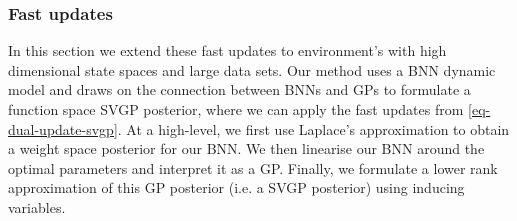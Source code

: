 \documentclass{article}
\begin{document}
\subsubsection{Fast updates}


In this section we extend these fast updates to environment's with high dimensional state spaces and large data sets.
Our method uses a BNN dynamic model and draws on the connection between BNNs and GPs
\citep{khanApproximate2019} to formulate a function space SVGP posterior,
where we can apply the fast updates from \cref{eq-dual-update-svgp}.
At a high-level, we first use Laplace's approximation to obtain a weight space posterior for our BNN.
We then linearise our BNN around the optimal parameters and interpret it as a GP.
Finally, we formulate a lower rank approximation of this GP posterior (i.e. a SVGP posterior) using inducing variables.
\end{document}
